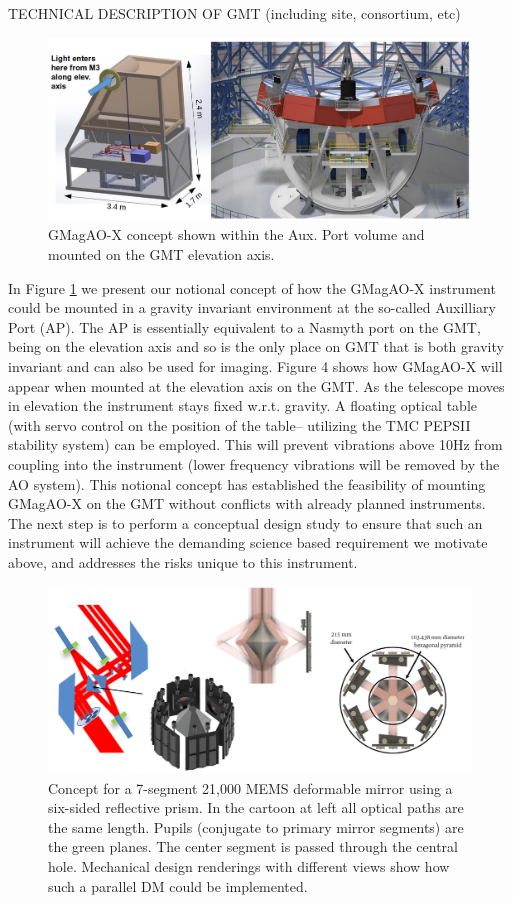\documentclass[12pt,preprint]{aastex}
\begin{document}
TECHNICAL DESCRIPTION OF GMT (including site, consortium, etc)

\begin{figure}[h!]
\centering
\includegraphics[width=6in]{figures/ap.png}
\caption{ GMagAO-X concept shown within the Aux. Port volume and mounted on the GMT elevation axis. \label{fig:ap}}
\end{figure}

In Figure \ref{fig:ap} we present our notional concept of how the GMagAO-X instrument could be mounted in a gravity invariant environment at the so-called Auxilliary Port (AP). The AP is essentially equivalent to a Nasmyth port on the GMT, being on the elevation axis and so is the only place on GMT that is both gravity invariant and can also be used for imaging.  Figure 4 shows how GMagAO-X will appear when mounted at the elevation axis on the GMT. As the telescope moves in elevation the instrument stays fixed w.r.t. gravity. A floating optical table (with servo control on the position of the table-- utilizing the TMC PEPSII stability system) can be employed.  This will prevent vibrations above 10Hz from coupling into the instrument (lower frequency vibrations will be removed by the AO system). 
This notional concept has established the feasibility of mounting GMagAO-X on the GMT without conflicts with already planned instruments.  The next step is to perform a conceptual design study to ensure that such an instrument will achieve the demanding science based requirement we motivate above, and addresses the risks unique to this instrument. 

\begin{figure} [h!]
\centering
\includegraphics[width=6in]{figures/pardm.png}
\caption{ Concept for a 7-segment 21,000 MEMS deformable mirror using a six-sided reflective prism.  In the cartoon at left all optical paths are the same length.  Pupils (conjugate to primary mirror segments) are the green planes. The center segment is passed through the central hole. Mechanical design renderings with different views show how such a parallel DM could be implemented.  \label{fig:pardm}}
\end{figure}
\end{document}
